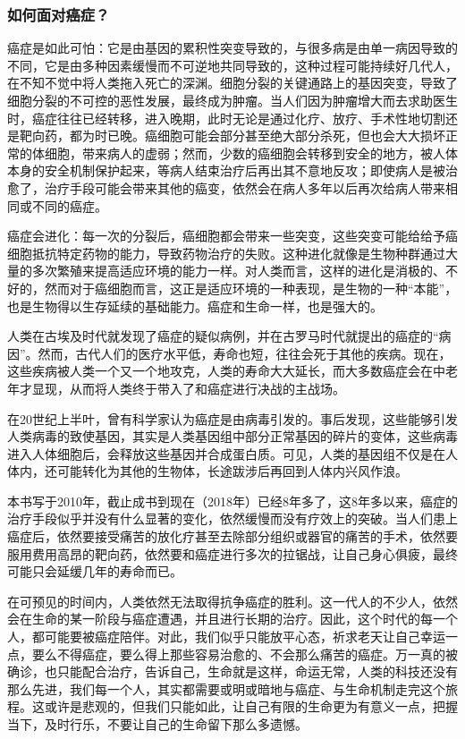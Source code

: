 \subsubsection{如何面对癌症？}
癌症是如此可怕：它是由基因的累积性突变导致的，与很多病是由单一病因导致的不同，它是由多种因素缓慢而不可逆地共同导致的，这种过程可能持续好几代人，在不知不觉中将人类拖入死亡的深渊。细胞分裂的关键通路上的基因突变，导致了细胞分裂的不可控的恶性发展，最终成为肿瘤。当人们因为肿瘤增大而去求助医生时，癌症往往已经转移，进入晚期，此时无论是通过化疗、放疗、手术性地切割还是靶向药，都为时已晚。癌细胞可能会部分甚至绝大部分杀死，但也会大大损坏正常的体细胞，带来病人的虚弱；然而，少数的癌细胞会转移到安全的地方，被人体本身的安全机制保护起来，等病人结束治疗后再出其不意地反攻；即使病人是被治愈了，治疗手段可能会带来其他的癌变，依然会在病人多年以后再次给病人带来相同或不同的癌症。

癌症会进化：每一次的分裂后，癌细胞都会带来一些突变，这些突变可能给给予癌细胞抵抗特定药物的能力，导致药物治疗的失败。这种进化就像是生物种群通过大量的多次繁殖来提高适应环境的能力一样。对人类而言，这样的进化是消极的、不好的，然而对于癌细胞而言，这正是适应环境的一种表现，是生物的一种“本能”，也是生物得以生存延续的基础能力。癌症和生命一样，也是强大的。

人类在古埃及时代就发现了癌症的疑似病例，并在古罗马时代就提出的癌症的“病因”。然而，古代人们的医疗水平低，寿命也短，往往会死于其他的疾病。现在，这些疾病被人类一个又一个地攻克，人类的寿命大大延长，而大多数癌症会在中老年才显现，从而将人类终于带入了和癌症进行决战的主战场。

在20世纪上半叶，曾有科学家认为癌症是由病毒引发的。事后发现，这些能够引发人类病毒的致使基因，其实是人类基因组中部分正常基因的碎片的变体，这些病毒进入人体细胞后，会释放这些基因并合成蛋白质。可见，人类的基因组不仅是在人体内，还可能转化为其他的生物体，长途跋涉后再回到人体内兴风作浪。

本书写于2010年，截止成书到现在（2018年）已经8年多了，这8年多以来，癌症的治疗手段似乎并没有什么显著的变化，依然缓慢而没有疗效上的突破。当人们患上癌症后，依然要接受痛苦的放化疗甚至去除部分组织或器官的痛苦的手术，依然要服用费用高昂的靶向药，依然要和癌症进行多次的拉锯战，让自己身心俱疲，最终可能只会延缓几年的寿命而已。

在可预见的时间内，人类依然无法取得抗争癌症的胜利。这一代人的不少人，依然会在生命的某一阶段与癌症遭遇，并且进行长期的治疗。因此，这个时代的每一个人，都可能要被癌症陪伴。对此，我们似乎只能放平心态，祈求老天让自己幸运一点，要么不得癌症，要么得上那些容易治愈的、不会那么痛苦的癌症。万一真的被确诊，也只能配合治疗，告诉自己，生命就是这样，命运无常，人类的科技还没有那么先进，我们每一个人，其实都需要或明或暗地与癌症、与生命机制走完这个旅程。这或许是悲观的，但我们只能如此，让自己有限的生命更为有意义一点，把握当下，及时行乐，不要让自己的生命留下那么多遗憾。

